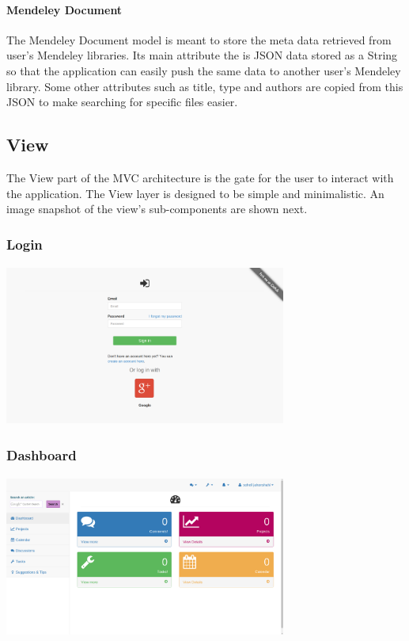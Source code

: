 \paragraph{Mendeley Document} %
The Mendeley Document model is meant to store the meta data retrieved from user's Mendeley libraries. Its main attribute the is JSON data
stored as a String so that the application can easily push the same data to another user's Mendeley library. Some other attributes such as
title, type and authors are copied from this JSON to make searching for specific files easier.

\subsection{View} %
The View part of the MVC architecture is the gate for the user to interact with the application. The View layer is designed to be simple
and minimalistic. An image snapshot of the view's sub-components are shown next.
\subsubsection{Login}

\begin{center}
\includegraphics[height=200px, width=350px]{./img/dsgn_img/login.png}
	
\end{center}

\subsubsection{Dashboard}

\begin{center}
\includegraphics[height=200px, width=350px]{./img/dsgn_img/dashboard.png}
	
\end{center}

